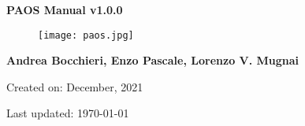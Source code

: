 

\begin{titlepage}

    \centering

    \vspace*{30mm} %
    \textbf{\Huge {PAOS Manual v1.0.0}}

    \vspace{20mm}
    \begin{figure}[!h]
        \centering
        \texttt{[image: paos.jpg]}
        \label{fig:paos_logo}
    \end{figure}

    \vspace{25mm}
    \Large \textbf{{Andrea Bocchieri, Enzo Pascale, Lorenzo V. Mugnai}}

    \vspace*{8mm}
    \small Created on: December, 2021

    \vspace{2mm}
    \small Last updated: \MonthYearFormat\today


\end{titlepage}

\clearpage
{}
\tableofcontents
\listoffigures
\listoftables
\clearpage
{}
